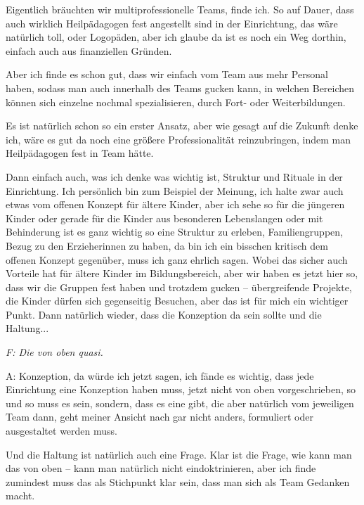 \begin{linenumbers*}
Eigentlich bräuchten wir multiprofessionelle Teams, finde ich. So auf Dauer, dass auch wirklich Heilpädagogen fest angestellt sind in der Einrichtung, das wäre natürlich toll, oder Logopäden, aber ich glaube da ist es noch ein Weg dorthin, einfach auch aus finanziellen Gründen. 

Aber ich finde es schon gut, dass wir einfach vom Team aus mehr Personal haben, sodass man auch innerhalb des Teams gucken kann, in welchen Bereichen können sich einzelne nochmal spezialisieren, durch Fort- oder Weiterbildungen. 

Es ist natürlich schon so ein erster Ansatz, aber wie gesagt auf die Zukunft denke ich, wäre es gut da noch eine größere Professionalität reinzubringen, indem man Heilpädagogen fest in Team hätte. 

Dann einfach auch, was ich denke was wichtig ist, Struktur und Rituale in der Einrichtung. Ich persönlich bin zum Beispiel der Meinung, ich halte zwar auch etwas vom offenen Konzept für ältere Kinder, aber ich sehe so für die jüngeren Kinder oder gerade für die  Kinder aus besonderen Lebenslangen oder mit Behinderung ist es ganz wichtig so eine Struktur zu erleben, Familiengruppen, Bezug zu den Erzieherinnen zu haben, da bin ich ein bisschen kritisch dem offenen Konzept gegenüber, muss ich ganz ehrlich sagen. Wobei das sicher auch Vorteile hat für ältere Kinder im Bildungsbereich, aber wir haben es jetzt hier so, dass wir die Gruppen fest haben und trotzdem gucken – übergreifende Projekte, die Kinder dürfen sich gegenseitig Besuchen, aber das ist für mich ein wichtiger Punkt. Dann natürlich wieder, dass die Konzeption da sein sollte und die Haltung...

\emph{F: Die von oben quasi.}

A: Konzeption, da würde ich jetzt sagen, ich fände es wichtig, dass jede Einrichtung eine Konzeption haben muss, jetzt nicht von oben vorgeschrieben, so und so muss es sein, sondern, dass es eine gibt, die aber natürlich vom jeweiligen Team dann, geht meiner Ansicht nach gar nicht anders, formuliert oder ausgestaltet werden muss. 

Und die Haltung ist natürlich auch eine Frage. Klar ist die Frage, wie kann man das von oben – kann man natürlich nicht eindoktrinieren, aber ich finde zumindest muss das als Stichpunkt klar sein, dass man sich als Team Gedanken macht. 


\end{linenumbers*}
